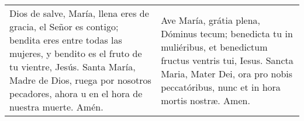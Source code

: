 \documentclass[./devocionario.tex]{subfiles}
\begin{document}
    \begin{longtable} { p{} p{} }
        Dios de salve, María, llena eres de gracia, el Señor es contigo; bendita eres entre todas las mujeres, 
        y bendito es el fruto de tu vientre, Jesús. Santa María, Madre de Dios, ruega por nosotros pecadores, 
        ahora u en el hora de nuestra muerte. Amén.
        
        &
        
        Ave María, grátia plena, Dóminus tecum; benedicta tu in muliéribus, et benedictum fructus ventris tui, 
        Iesus. Sancta Maria, Mater Dei, ora pro nobis peccatóribus, nunc et in hora mortis nostræ. Amen.
    \end{longtable}
\end{document}
